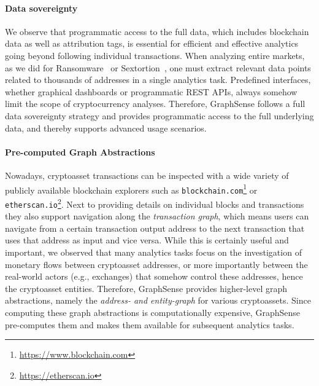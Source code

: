 \paragraph{Data sovereignty} We observe that programmatic access to the full data, which includes blockchain data as well as attribution tags, is essential for efficient and effective analytics going beyond following individual transactions. When analyzing entire markets, as we did for Ransomware~\cite{PaquetClouson:2019aa} or Sextortion~\cite{PaquetClouson:2019bb}, one must extract relevant data points related to thousands of addresses in a single analytics task. Predefined interfaces, whether graphical dashboards or programmatic REST APIs, always somehow limit the scope of cryptocurrency analyses. Therefore, GraphSense follows a full data sovereignty strategy and provides programmatic access to the full underlying data, and thereby supports advanced usage scenarios.

\paragraph{Pre-computed Graph Abstractions} Nowadays, cryptoasset transactions can be inspected with a wide variety of publicly available blockchain explorers such as \texttt{blockchain.com}\footnote{\url{https://www.blockchain.com}} or \texttt{etherscan.io}\footnote{\url{https://etherscan.io}}. Next to providing details on individual blocks and transactions they also support navigation along the \emph{transaction graph}, which means users can navigate from a certain transaction output address to the next transaction that uses that address as input and vice versa. While this is certainly useful and important, we observed that many analytics tasks focus on the investigation of monetary flows between cryptoasset addresses, or more importantly between the real-world actors (e.g., exchanges) that somehow control these addresses, hence the cryptoasset entities. Therefore, GraphSense provides higher-level graph abstractions, namely the \emph{address- and entity-graph} for various cryptoassets. Since computing these graph abstractions is computationally expensive, GraphSense pre-computes them and makes them available for subsequent analytics tasks.


